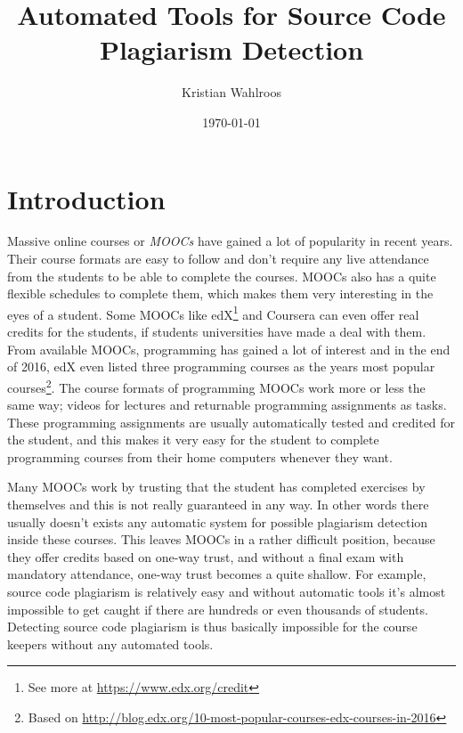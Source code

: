 \documentclass[english]{tktltiki2}
\title{Automated Tools for Source Code Plagiarism Detection}
\author{Kristian Wahlroos}
\date{\today}
\theoremstyle{definition}
\theoremstyle{remark}
\begin{document}

\frontmatter      %

\maketitle        %
\makeabstract     %

\tableofcontents  %


\mainmatter       %

\section{Introduction}



Massive online courses or \textit{MOOCs} have gained a lot of popularity in recent years. Their course formats are easy to follow and don't require any live attendance from the students to be able to complete the courses. MOOCs also has a quite flexible schedules to complete them, which makes them very interesting in the eyes of a student. Some MOOCs like edX\footnote{See more at \url{https://www.edx.org/credit}} and Coursera can even offer real credits for the students, if students universities have made a deal with them. From available MOOCs, programming has gained a lot of interest and in the end of 2016, edX even listed three programming courses as the years most popular courses\footnote{Based on \url{http://blog.edx.org/10-most-popular-courses-edx-courses-in-2016}}. The course formats of programming MOOCs work more or less the same way; videos for lectures and returnable programming assignments as tasks. These programming assignments are usually automatically tested and credited for the student, and this makes it very easy for the student to complete programming courses from their home computers whenever they want.

Many MOOCs work by trusting that the student has completed exercises by themselves and this is not really guaranteed in any way. In other words there usually doesn't exists any automatic system for possible plagiarism detection inside these courses. This leaves MOOCs in a rather difficult position, because they offer credits based on one-way trust, and without a final exam with mandatory attendance, one-way trust becomes a quite shallow. For example, source code plagiarism is relatively easy and without automatic tools it's almost impossible to get caught if there are hundreds or even thousands of students. Detecting source code plagiarism is thus basically impossible for the course keepers without any automated tools. 
\end{document}
